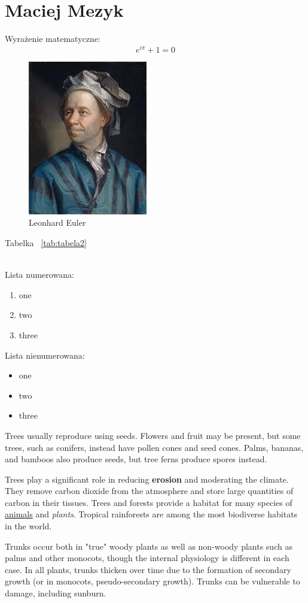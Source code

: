 \section{Maciej Mezyk}
Wyrażenie matematyczne: 
\[e^{i\pi}+1=0\]

\begin{figure} [htbp]
    \centering
    \includegraphics[scale=1.1]{pictures/euler.jpg}
    \caption{Leonhard Euler}
\end{figure}


Tabelka ~\ref{tab:tabela2}

\\

Lista numerowana:
\begin{enumerate}
    \item one
    \item two
    \item three
\end{enumerate}

 Lista nienumerowana:
\begin{itemize}
    \item one
    \item two
    \item three
\end{itemize}

Trees usually reproduce using seeds. Flowers and fruit may be present, but some trees, such as conifers, instead have pollen cones and seed cones. Palms, bananas, and bamboos also produce seeds, but tree ferns produce spores instead.

Trees play a significant role in reducing \textbf{erosion} and moderating the climate. They remove carbon dioxide from the atmosphere and store large quantities of carbon in their tissues. Trees and forests provide a habitat for many species of \underline{animals} and \emph{plants}. Tropical rainforests are among the most biodiverse habitats in the world.

Trunks occur both in "true" woody plants as well as non-woody plants such as palms and other monocots, though the internal physiology is different in each case. In all plants, trunks thicken over time due to the formation of secondary growth (or in monocots, pseudo-secondary growth). Trunks can be vulnerable to damage, including sunburn.